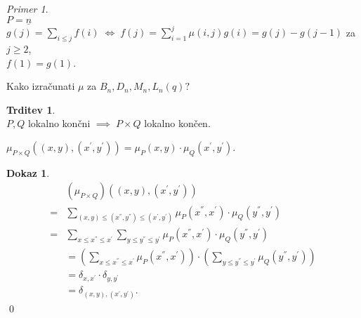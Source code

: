 \documentclass[a4paper, 12pt]{book}
\theoremstyle{definition}
\newtheorem{claim}[counter]{Trditev}
\newtheorem{pro}[counter]{Dokaz}
\theoremstyle{remark}
\newtheorem*{ex}{Primer}
\begin{document}
\begin{ex} \text{} \\
  $P = \underline{n}$ \\
  $g(j) = \sum_{i \leq j} f(i) \; \iff \; f(j) = \sum_{i=1}^j \mu(i,j) g(i) = g(j) - g(j-1)$ za $j \geq 2$, \\
  $f(1) = g(1)$.  
\end{ex}
Kako izračunati $\mu$ za $B_n, D_n, M_n, L_n(q)?$ \\
\begin{claim} \text{} \\
  $P, Q$ lokalno končni $\implies \; P \times Q$ lokalno končen.
\end{claim}
$\mu_{P \times Q} \left((x,y), (x^{'}, y^{'})\right) = \mu_P(x,y) \cdot \mu_Q(x^{'}, y^{'})$.
\begin{pro}
  \begin{align*}
    &\left(\mu_{P \times Q} \right) \left((x,y), (x^{'}, y^{'})\right) \\
    =& \sum_{(x,y) \leq (x^{''},y^{''}) \leq (x^{'},y^{'})} \mu_P(x^{''},x^{'}) \cdot \mu_Q(y^{''},y^{'}) \\
    =& \sum_{x \leq x^{''} \leq x^{'}} \sum_{y \leq y^{''} \leq y^{'}}
      \mu_P(x^{''}, x^{'}) \cdot \mu_Q(y^{''}, y^{'}) \\
    &= \left(\sum_{x \leq x^{''} \leq x^{'}} \mu_P(x^{''}, x^{'})\right) \cdot 
      \left(\sum_{y \leq y^{''} \leq y^{'}} \mu_Q(y^{''}, y^{'})\right) \\
    &= \delta_{x,x^{'}} \cdot \delta_{y,y^{'}} \\
    &= \delta_{(x,y), (x^{'},y^{'})}.
  \end{align*}
  \qed
\end{pro}
\end{document}
